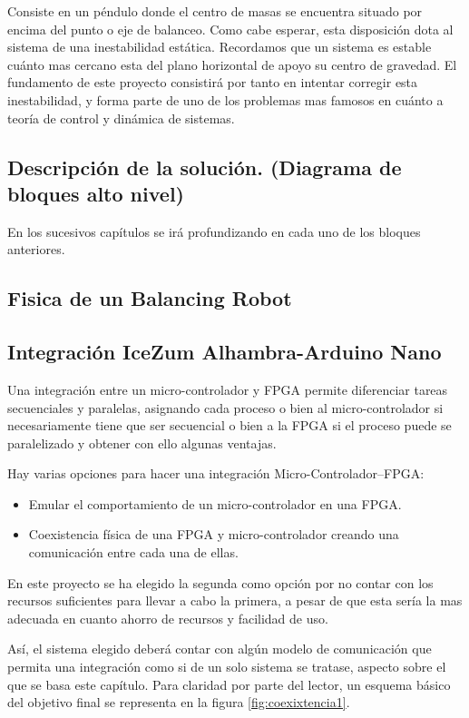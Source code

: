 Consiste en un péndulo donde el centro de masas se encuentra situado por encima del punto o eje de balanceo. Como cabe esperar, esta disposición dota al sistema de una inestabilidad estática. Recordamos que un sistema es estable cuánto mas cercano esta del plano horizontal de apoyo su centro de gravedad. \newline
El fundamento de este proyecto consistirá por tanto en intentar corregir esta inestabilidad, y forma parte de uno de los problemas mas famosos en cuánto a teoría de control y dinámica de sistemas. 

\subsection{Descripción de la solución. (Diagrama de bloques alto nivel)}
En los sucesivos capítulos se irá profundizando en cada uno de los bloques anteriores. 
\subsection{Fisica de un Balancing Robot}
\subsection{Integración IceZum Alhambra-Arduino Nano}
Una integración entre un micro-controlador y FPGA permite diferenciar tareas secuenciales y paralelas, asignando cada proceso o bien al micro-controlador si necesariamente tiene que ser secuencial o bien a la FPGA si el proceso puede se paralelizado y obtener con ello algunas ventajas. \newline

Hay varias opciones para hacer una integración Micro-Controlador--FPGA:
 
\begin{itemize}
	\item Emular el comportamiento de un micro-controlador en una FPGA.
	\item Coexistencia física de una FPGA y micro-controlador creando una comunicación entre cada una de ellas.
\end{itemize}
En este proyecto se ha elegido la segunda como opción por no contar con los recursos suficientes para llevar a cabo la primera, a pesar de que esta sería la mas adecuada en cuanto ahorro de recursos y facilidad de uso. \newline

Así, el sistema elegido deberá contar con algún modelo de comunicación que permita una integración como si de un solo sistema se tratase, aspecto sobre el que se basa este capítulo. Para claridad por parte del lector, un esquema básico del objetivo final se representa en la figura \ref{fig:coexixtencia1}.

